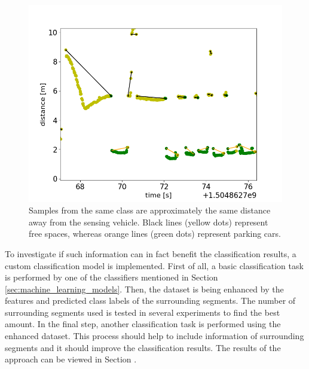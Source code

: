 \begin{figure}
	\centering
	\includegraphics[width=\textwidth]{img/data_segmentation_example_similar_distances_same_class.png}
	\caption{Samples from the same class are approximately the same distance away from the sensing vehicle. Black lines (yellow dots) represent free spaces, whereas orange lines (green dots) represent parking cars.}
	\label{fig:surrounding_segments_similarity}
\end{figure}

To investigate if such information can in fact benefit the classification results, a custom classification model is implemented. First of all, a basic classification task is performed by one of the classifiers mentioned in Section \ref{sec:machine_learning_models}. Then, the dataset is being enhanced by the features and predicted class labels of the surrounding segments. The number of surrounding segments used is tested in several experiments to find the best amount. In the final step, another classification task is performed using the enhanced dataset. This process should help to include information of surrounding segments and it should improve the classification results. The results of the approach can be viewed in Section .



